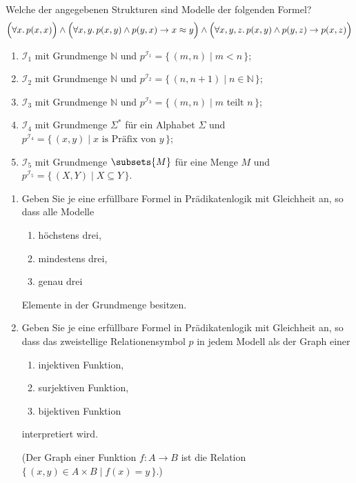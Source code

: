 \documentclass[german]{latteachCD}[2017/03/28]
\begin{document}
\setcounter{exercise}{0}

\enlargethispage{2\baselineskip}

\begin{exercise}
  Welche der angegebenen Strukturen sind Modelle der folgenden Formel?
  \begin{equation*}
    \Bigl(\forall x.\, p(x,x)\Bigr) \land \Bigl(\forall x, y.\, p(x,y) \land
      p(y,x) \to x \approx y\Bigr)
    \land \Bigl(\forall x, y, z.\, p(x,y) \land p(y,z) \to p(x,z)\Bigr)
  \end{equation*}
  \begin{enumerate}
  \item $\mathcal{I}_{1}$ mit Grundmenge $\mathbb N$ und $p^{\mathcal{I}_{1}} =
    \{\,(m,n) \mid m < n \,\}$;
  \item $\mathcal{I}_{2}$ mit Grundmenge $\mathbb N$ und $p^{\mathcal{I}_{2}} =
    \{\,(n,n+1) \mid n \in \mathbb N \,\}$;
  \item $\mathcal{I}_{3}$ mit Grundmenge $\mathbb N$ und $p^{\mathcal{I}_{3}} =
    \{\,(m,n) \mid m \text{ teilt } n\,\}$;
  \item $\mathcal{I}_{4}$ mit Grundmenge $\Sigma^{*}$ für ein Alphabet $\Sigma$
    und $p^{\mathcal{I}_{4}} = \{\,(x,y) \mid x \text{ is Präfix von } y\,\}$;
  \item $\mathcal{I}_{5}$ mit Grundmenge $\subsets{M}$ für eine Menge $M$ und
    $p^{\mathcal{I}_{5}} = \{\,(X,Y) \mid X \subseteq Y\,\}$.
  \end{enumerate}
\end{exercise}

\begin{exercise}
  \begin{enumerate}
  \item Geben Sie je eine erfüllbare Formel in Prädikatenlogik mit Gleichheit
    an, so dass alle Modelle
    \begin{enumerate}
    \item höchstens drei,
    \item mindestens drei,
    \item genau drei
    \end{enumerate}
    Elemente in der Grundmenge besitzen.
  \item Geben Sie je eine erfüllbare Formel in Prädikatenlogik mit Gleichheit
    an, so dass das zweistellige Relationensymbol $p$ in jedem Modell als der
    Graph einer
    \begin{enumerate}
    \item injektiven Funktion,
    \item surjektiven Funktion,
    \item bijektiven Funktion
    \end{enumerate}
    interpretiert wird.

    (Der Graph einer Funktion $f \colon A \to B$ ist die Relation $\{\,(x,y) \in
    A \times B \mid f(x) = y\,\}$.)
  \end{enumerate}
\end{exercise}
\end{document}
